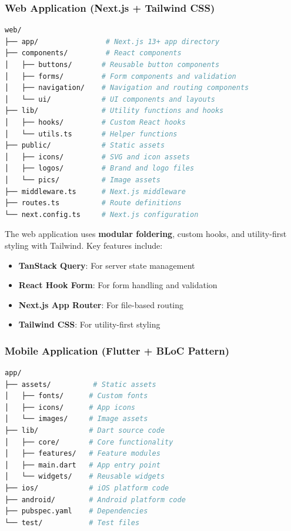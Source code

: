 \subsubsection{Web Application (Next.js + Tailwind CSS)}

\begin{lstlisting}[language=bash, caption={Web Application Directory Structure (tree -L 2)}]
web/
├── app/                # Next.js 13+ app directory
├── components/         # React components
│   ├── buttons/       # Reusable button components
│   ├── forms/         # Form components and validation
│   ├── navigation/    # Navigation and routing components
│   └── ui/            # UI components and layouts
├── lib/               # Utility functions and hooks
│   ├── hooks/         # Custom React hooks
│   └── utils.ts       # Helper functions
├── public/            # Static assets
│   ├── icons/         # SVG and icon assets
│   ├── logos/         # Brand and logo files
│   └── pics/          # Image assets
├── middleware.ts      # Next.js middleware
├── routes.ts          # Route definitions
└── next.config.ts     # Next.js configuration
\end{lstlisting}

\begin{tcolorbox}[title=Web Architecture]
The web application uses \textbf{modular foldering}, custom hooks, and utility-first styling with Tailwind. Key features include:
\begin{itemize}
    \item \textbf{TanStack Query}: For server state management
    \item \textbf{React Hook Form}: For form handling and validation
    \item \textbf{Next.js App Router}: For file-based routing
    \item \textbf{Tailwind CSS}: For utility-first styling
\end{itemize}
\end{tcolorbox}

\subsubsection{Mobile Application (Flutter + BLoC Pattern)}

\begin{lstlisting}[language=bash, caption={Mobile Application Directory Structure (tree -L 2)}]
app/
├── assets/          # Static assets
│   ├── fonts/      # Custom fonts
│   ├── icons/      # App icons
│   └── images/     # Image assets
├── lib/            # Dart source code
│   ├── core/       # Core functionality
│   ├── features/   # Feature modules
│   ├── main.dart   # App entry point
│   └── widgets/    # Reusable widgets
├── ios/            # iOS platform code
├── android/        # Android platform code
├── pubspec.yaml    # Dependencies
└── test/           # Test files
\end{lstlisting}

